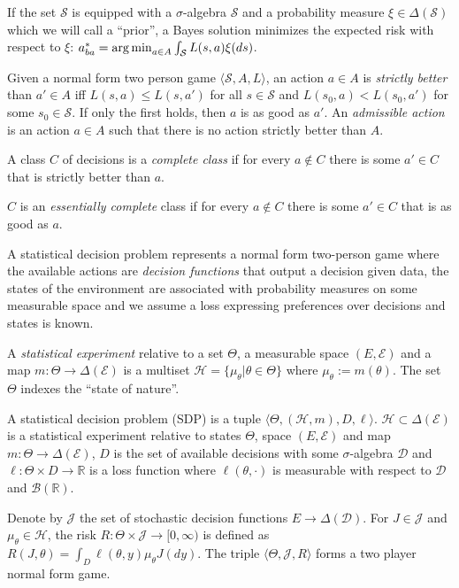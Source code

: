 If the set $\mathscr{S}$ is equipped with a $\sigma$-algebra $\mathcal{S}$ and a probability measure $\xi\in \Delta(\mathcal{S})$ which we will call a ``prior'', a Bayes solution minimizes the expected risk with respect to $\xi$: $a^*_{ba} = \operatorname*{arg\,min}_{a\in A} \int_{\mathcal{S}} L(s,a) \xi(ds)$.

\begin{definition}
Given a normal form two person game $\langle \mathscr{S}, A, L\rangle$, an action $a\in A$ is \emph{strictly better} than $a'\in A$ iff $L(s,a)\leq L(s,a')$ for all $s\in\mathscr{S}$ and $L(s_0,a)<L(s_0,a')$ for some $s_0\in \mathscr{S}$. If only the first holds, then $a$ is as good as $a'$. An \emph{admissible action} is an action $a\in A$ such that there is no action strictly better than $A$.
\end{definition}

\begin{definition}
A class $C$ of decisions is a \emph{complete class} if for every $a\not\in C$ there is some $a'\in C$ that is strictly better than $a$.

$C$ is an \emph{essentially complete} class if for every $a\not\in C$ there is some $a'\in C$ that is as good as $a$.
\end{definition}

A statistical decision problem represents a normal form two-person game where the available actions are \emph{decision functions} that output a decision given data, the states of the environment are associated with probability measures on some measurable space and we assume a loss expressing preferences over decisions and states is known.

\begin{definition}\label{def:stat_expt}
A \emph{statistical experiment} relative to a set $\Theta$, a measurable space $(E,\mathcal{E})$ and a map $m:\Theta\to \Delta(\mathcal{E})$ is a multiset $\mathscr{H}=\{\mu_\theta|\theta\in \Theta\}$ where $\mu_\theta:=m(\theta)$. The set $\Theta$ indexes the ``state of nature''.
\end{definition}


\begin{definition}
A statistical decision problem (SDP) is a tuple $\langle\Theta, (\mathscr{H},m), D, \ell\rangle$. $\mathscr{H}\subset\Delta(\mathcal{E})$ is a statistical experiment relative to states $\Theta$, space $(E,\mathcal{E})$ and map $m:\Theta\to \Delta(\mathcal{E})$, $D$ is the set of available decisions with some $\sigma$-algebra $\mathcal{D}$ and $\ell:\Theta\times D\to \mathbb{R}$ is a loss function where $\ell(\theta,\cdot)$ is measurable with respect to $\mathcal{D}$ and $\mathcal{B}(\mathbb{R})$.

Denote by $\mathscr{J}$ the set of stochastic decision functions $E\to \Delta(\mathcal{D})$. For $J\in \mathscr{J}$ and $\mu_\theta\in \mathcal{H}$, the risk $R:\Theta\times\mathscr{J}\to [0,\infty)$ is defined as $R(J,\theta) = \int_D \ell(\theta,y) \mu_\theta J(dy)$. The triple $\langle \Theta, \mathscr{J}, R\rangle$ forms a two player normal form game.
\end{definition}

